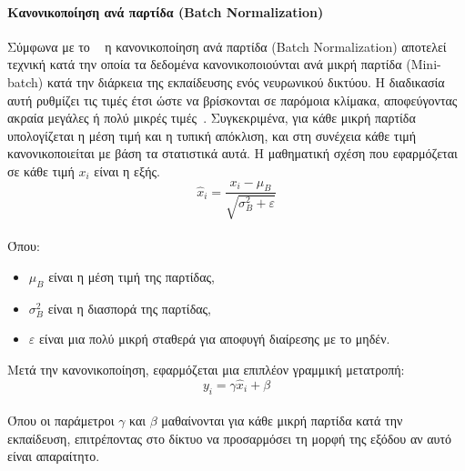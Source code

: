 \documentclass[12pt]{article}
\numberwithin{equation}{section}
\begin{document}
\paragraph{Κανονικοποίηση ανά παρτίδα (Batch Normalization) \\ [0.5cm]}

Σύμφωνα με το ~\cite{ioffe2015batchnormalizationacceleratingdeep} η κανονικοποίηση ανά παρτίδα (Batch Normalization) αποτελεί τεχνική κατά την οποία τα δεδομένα κανονικοποιούνται ανά μικρή παρτίδα (Mini-batch) κατά την διάρκεια της εκπαίδευσης ενός νευρωνικού δικτύου. Η διαδικασία αυτή ρυθμίζει τις τιμές έτσι ώστε να βρίσκονται σε παρόμοια κλίμακα, αποφεύγοντας ακραία μεγάλες ή πολύ μικρές τιμές~\cite{lian2018revisitbatchnormalizationnew}. Συγκεκριμένα, για κάθε μικρή παρτίδα υπολογίζεται η μέση τιμή και η τυπική απόκλιση, και στη συνέχεια κάθε τιμή κανονικοποιείται με βάση τα στατιστικά αυτά. Η μαθηματική σχέση που εφαρμόζεται σε κάθε τιμή \( x_i \) είναι η εξής.\\

\begin{equation}
\hat{x}_i = \frac{x_i - \mu_B}{\sqrt{\sigma_B^2 + \varepsilon}}
\end{equation}\\

\noindent Όπου:

\begin{itemize}
    \item \( \mu_B \) είναι η μέση τιμή της παρτίδας,
    \item \( \sigma_B^2 \) είναι η διασπορά της παρτίδας,
    \item \( \varepsilon \) είναι μια πολύ μικρή σταθερά για αποφυγή διαίρεσης με το μηδέν.\\
    
\end{itemize}

\noindent Μετά την κανονικοποίηση, εφαρμόζεται μια επιπλέον γραμμική μετατροπή:\\

\begin{equation}
y_i = \gamma \hat{x}_i + \beta
\end{equation}\\

\noindent Όπου οι παράμετροι \( \gamma \) και \( \beta \) μαθαίνονται για κάθε μικρή παρτίδα κατά την εκπαίδευση, επιτρέποντας στο δίκτυο να προσαρμόσει τη μορφή της εξόδου αν αυτό είναι απαραίτητο.\\
\end{document}
